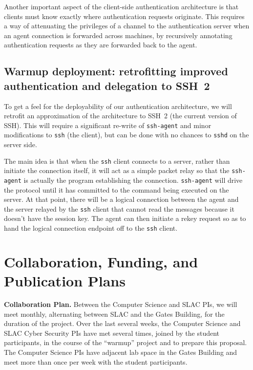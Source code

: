\documentclass[10pt]{article}
\begin{document}
Another important aspect of the client-side authentication
architecture is that clients must know exactly where authentication
requests originate.  This requires a way of attenuating the privileges
of a channel to the authentication server when an agent connection is
forwarded across machines, by recursively annotating authentication
requests as they are forwarded back to the agent.

\subsection{Warmup deployment: retrofitting improved authentication
  and delegation to SSH~2}
\label{ss:warmup}

To get a feel for the deployability of our authentication
architecture, we will retrofit an approximation of the architecture to
SSH~2 (the current version of SSH).  This will require a significant
re-write of \texttt{ssh-agent} and minor modifications to \texttt{ssh}
(the client), but can be done with no chances to \texttt{sshd} on the
server side.

The main idea is that when the \texttt{ssh} client connects to a
server, rather than initiate the connection itself, it will act as a
simple packet relay so that the \texttt{ssh-agent} is actually the
program establishing the connection.  \texttt{ssh-agent} will drive
the protocol until it has committed to the command being executed on
the server.  At that point, there will be a logical connection between
the agent and the server relayed by the \texttt{ssh} client that
cannot read the messages because it doesn't have the session key.  The
agent can then initiate a rekey request so as to hand the logical
connection endpoint off to the \texttt{ssh} client.

\section{Collaboration, Funding, and Publication Plans}

\textbf{Collaboration Plan.} Between the Computer Science and SLAC PIs, we will meet monthly,
alternating between SLAC and the Gates Building, for the duration of
the project. Over the last several weeks, the Computer Science and
SLAC Cyber Security PIs have met several times, joined by the student
participants, in the course of the ``warmup'' project and to prepare
this proposal. The Computer Science PIs have adjacent lab space in the
Gates Building and meet more than once per week with the student
participants.
\end{document}
